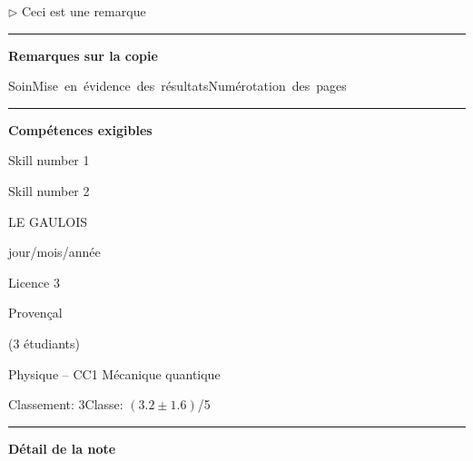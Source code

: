 \documentclass[12pt, a4paper]{article}
\begin{document}
$\triangleright$\xspace Ceci est une remarque


\noindent\rule{\linewidth}{.7pt}\begin{center}{\large\bf Remarques sur la copie}\end{center}

\begin{center}
\noindent \mbox{Soin\xspace\xspace\color{DarkGreen}\faSmileO\color{black}}\hfill \mbox{Mise en évidence des résultats\xspace\xspace\color{DarkGreen}\faSmileO\color{black}}\hfill \mbox{Numérotation des pages\xspace\xspace\color{DarkGreen}\faSmileO\color{black}}\hfill 
\end{center}


\noindent\rule{\linewidth}{.7pt}\begin{center}{\large\bf Compétences exigibles}\end{center}

\begin{minipage}[c]{0.4\linewidth}\centering
Skill number 1\xspace\xspace\color{DarkGreen}\faSmileO\color{black}
\end{minipage}\hfill
\begin{minipage}[c]{0.4\linewidth}\centering
Skill number 2\xspace\xspace\color{DarkRed}\faFrownO\color{black}
\end{minipage}
\newpage
\pagestyle{empty}
\noindent\begin{minipage}[c]{0.31\linewidth}\noindent LE GAULOIS\end{minipage}\hfill
\begin{minipage}[c]{0.31\linewidth}\centering jour/mois/année \end{minipage}\hfill
\begin{minipage}[c]{0.31\linewidth}\hfill Licence 3 \end{minipage}\hfill

\noindent\begin{minipage}[c]{0.31\linewidth}\noindent Provençal\end{minipage}\hfill
\begin{minipage}[c]{0.31\linewidth}\hfill(3 étudiants)\end{minipage}
\begin{center} Physique -- CC1 Mécanique quantique\bigskip

{\Large\bf {}}\end{center}

\vspace*{-0.7cm}\noindent Classement: 3\hfill Classe:  $\left(3.2 \pm 1.6\right)$/5
\noindent\rule{\linewidth}{.7pt}\begin{center}{\large\bf Détail de la note}\end{center}
\end{document}
